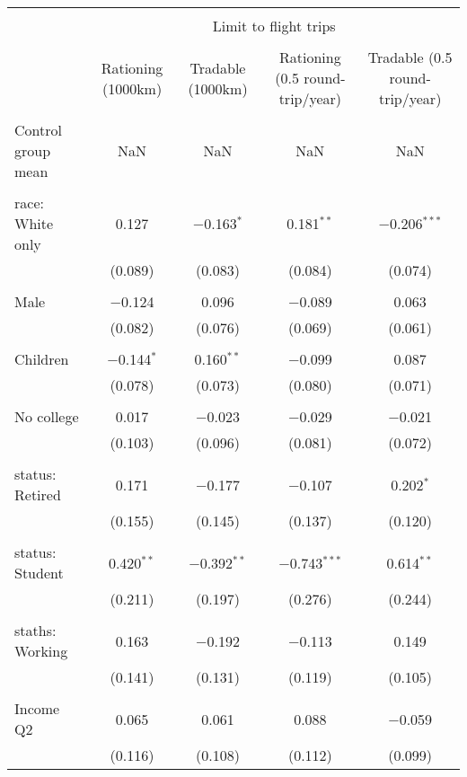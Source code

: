 
\begin{tabular}{@{\extracolsep{5pt}}lcccc} 
\\[-1.8ex]\hline 
\hline \\[-1.8ex] 
 & \multicolumn{4}{c}{Limit to flight trips} \\ 
\cline{2-5} 
\\[-1.8ex] & Rationing (1000km) & Tradable (1000km) & Rationing (0.5 round-trip/year) & Tradable (0.5 round-trip/year) \\ 
\hline \\[-1.8ex] 
 Control group mean & NaN & NaN & NaN & NaN  \\ \hline \\[-1.8ex] race: White only & 0.127 & $-$0.163$^{*}$ & 0.181$^{**}$ & $-$0.206$^{***}$ \\ 
  & (0.089) & (0.083) & (0.084) & (0.074) \\ 
  & & & & \\ 
 Male & $-$0.124 & 0.096 & $-$0.089 & 0.063 \\ 
  & (0.082) & (0.076) & (0.069) & (0.061) \\ 
  & & & & \\ 
 Children & $-$0.144$^{*}$ & 0.160$^{**}$ & $-$0.099 & 0.087 \\ 
  & (0.078) & (0.073) & (0.080) & (0.071) \\ 
  & & & & \\ 
 No college & 0.017 & $-$0.023 & $-$0.029 & $-$0.021 \\ 
  & (0.103) & (0.096) & (0.081) & (0.072) \\ 
  & & & & \\ 
 status: Retired & 0.171 & $-$0.177 & $-$0.107 & 0.202$^{*}$ \\ 
  & (0.155) & (0.145) & (0.137) & (0.120) \\ 
  & & & & \\ 
 status: Student & 0.420$^{**}$ & $-$0.392$^{**}$ & $-$0.743$^{***}$ & 0.614$^{**}$ \\ 
  & (0.211) & (0.197) & (0.276) & (0.244) \\ 
  & & & & \\ 
 staths: Working & 0.163 & $-$0.192 & $-$0.113 & 0.149 \\ 
  & (0.141) & (0.131) & (0.119) & (0.105) \\ 
  & & & & \\ 
 Income Q2 & 0.065 & 0.061 & 0.088 & $-$0.059 \\ 
  & (0.116) & (0.108) & (0.112) & (0.099) \\ 

\end{tabular}

